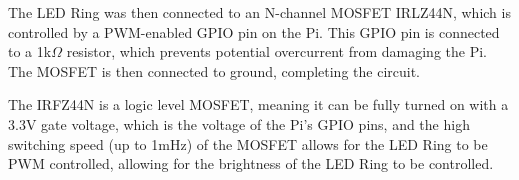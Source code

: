 The LED Ring was then connected to an N-channel MOSFET IRLZ44N\cite{irlz44n}, which is controlled by a PWM-enabled GPIO pin on the Pi.
This GPIO pin is connected to a 1k$\Omega$ resistor, which prevents potential overcurrent from damaging the Pi. The MOSFET is then connected to ground, completing the circuit.

The IRFZ44N is a logic level MOSFET, meaning it can be fully turned on with a 3.3V gate voltage, which is the voltage of the Pi's GPIO pins, and the high
switching speed (up to 1mHz) of the MOSFET allows for the LED Ring to be PWM controlled, allowing for the brightness of the LED Ring to be controlled.